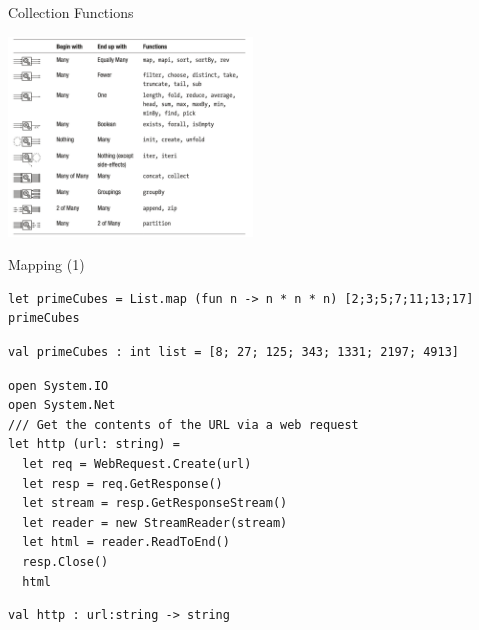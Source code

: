 \documentclass[t]{beamer}
\begin{document}
\begin{frame}[label={sec:orgbc6cd05}]{Collection Functions}
\begin{center}
\includegraphics[height=200]{../img/CollectionFunctions.png}
\label{fig:collection-functions}
\end{center}
\end{frame}

\begin{frame}[label={sec:orgb1ee724},fragile]{Mapping (1)}
 \begin{verbatim}
let primeCubes = List.map (fun n -> n * n * n) [2;3;5;7;11;13;17]
primeCubes
\end{verbatim}

\begin{verbatim}
val primeCubes : int list = [8; 27; 125; 343; 1331; 2197; 4913]
\end{verbatim}


\begin{verbatim}
open System.IO 
open System.Net
/// Get the contents of the URL via a web request
let http (url: string) =
  let req = WebRequest.Create(url)
  let resp = req.GetResponse()
  let stream = resp.GetResponseStream() 
  let reader = new StreamReader(stream) 
  let html = reader.ReadToEnd() 
  resp.Close()
  html
\end{verbatim}

\begin{verbatim}
val http : url:string -> string
\end{verbatim}
\end{frame}
\end{document}
